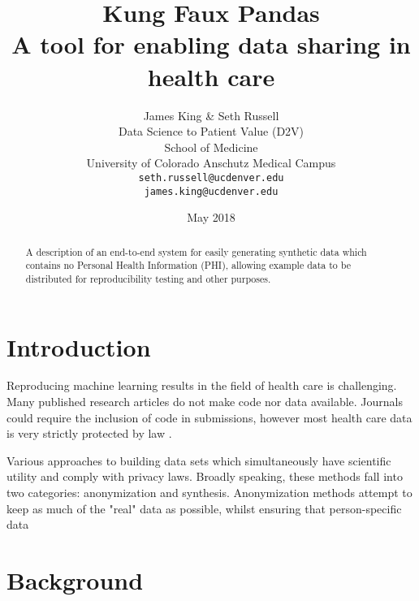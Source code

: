 \documentclass{article}
\title{%
  Kung Faux Pandas \\
  \large A tool for enabling data sharing in health care}
\author{
  James King \& Seth Russell\\
  Data Science to Patient Value (D2V)\\
  School of Medicine \\
  University of Colorado Anschutz Medical Campus\\
  \texttt{seth.russell@ucdenver.edu} \\
  \texttt{james.king@ucdenver.edu} \\ 
  }
\date{May 2018}
\begin{document}

\maketitle

\begin{abstract}
A description of an end-to-end system for easily generating synthetic data which contains no Personal Health Information (PHI), allowing example data to be distributed for reproducibility testing and other purposes.  

\end{abstract}



\section{Introduction}

Reproducing machine learning results in the field of health care is challenging. Many published research articles do not make code nor data available. Journals could require the inclusion of code in submissions, however most health care data is very strictly protected by law \cite{hippapro}.  

Various approaches to building data sets which simultaneously have scientific utility and comply with privacy laws.  Broadly speaking, these methods fall into two categories: anonymization and synthesis.  Anonymization methods attempt to keep as much of the "real" data as possible, whilst ensuring that person-specific data 

\section{Background}
\end{document}
